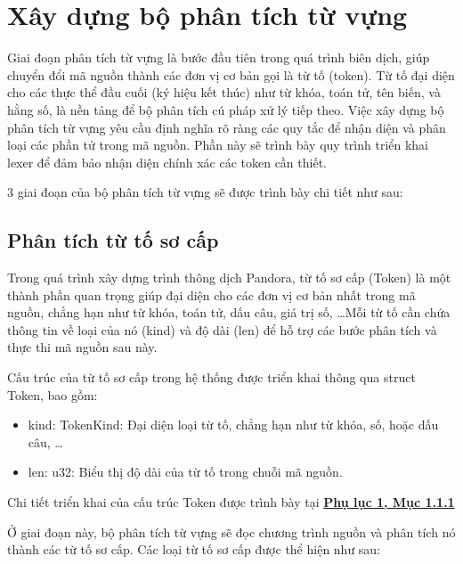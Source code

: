 \section{Xây dựng bộ phân tích từ vựng}
Giai đoạn phân tích từ vựng là bước đầu tiên trong quá trình biên dịch, giúp chuyển đổi mã nguồn thành các đơn vị cơ bản gọi là từ tố (token). Từ tố đại diện cho các thực thể đầu cuối (ký hiệu kết thúc) như từ khóa, toán tử, tên biến, và hằng số, là nền tảng để bộ phân tích cú pháp xử lý tiếp theo. Việc xây dựng bộ phân tích từ vựng yêu cầu định nghĩa rõ ràng các quy tắc để nhận diện và phân loại các phần tử trong mã nguồn. Phần này sẽ trình bày quy trình triển khai lexer để đảm bảo nhận diện chính xác các token cần thiết.

3 giai đoạn của bộ phân tích từ vựng sẽ được trình bày chi tiết như sau:

\subsection{Phân tích từ tố sơ cấp}
Trong quá trình xây dựng trình thông dịch Pandora, từ tố sơ cấp (Token) là một thành phần quan trọng giúp đại diện cho các đơn vị cơ bản nhất trong mã nguồn, chẳng hạn như từ khóa, toán tử, dấu câu, giá trị số, \dots Mỗi từ tố cần chứa thông tin về loại của nó (kind) và độ dài (len) để hỗ trợ các bước phân tích và thực thi mã nguồn sau này.

Cấu trúc của từ tố sơ cấp trong hệ thống được triển khai thông qua struct Token, bao gồm:
\begin{itemize}
  \item kind: TokenKind: Đại diện loại từ tố, chẳng hạn như từ khóa, số, hoặc dấu câu, \dots
  \item len: u32: Biểu thị độ dài của từ tố trong chuỗi mã nguồn.
\end{itemize}
Chi tiết triển khai của cấu trúc Token được trình bày tại \hyperref[ap1:simple_token]{\bfseries Phụ lục 1, Mục 1.1.1}

Ở giai đoạn này, bộ phân tích từ vựng sẽ đọc chương trình nguồn và phân tích nó thành các từ tố sơ cấp. Các loại từ tố sơ cấp được thể hiện như sau:

